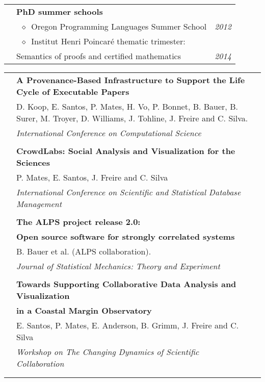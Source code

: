 \documentclass[10pt]{article}
\makeatletter
\newcommand{\category}[2]{
\begin{center}
\vskip 6pt
\begin{tabular*}{\textwidth}{@{}p{0.75in}@{\quad\;\;}p{4in}@{\quad\quad}p{0.7in}}
\vcrush[t]{1in}{\textsc{#1}} &
#2
\end{tabular*}
\end{center}
}
\newcommand{\categoryB}[2]{
\begin{center}
\vskip 6pt
\begin{tabular*}{\textwidth}{@{}p{0.75in}@{\quad\;\;}p{4.4in}@{\quad\quad}p{0.3in}}
\vcrush[t]{1in}{\textsc{#1}} &
#2
\end{tabular*}
\end{center}
}
\newcommand{\n}{\\ & }
\newcommand{\nn}{\\ \n}
\newcommand{\DT}[1]{&\hspace{\stretch 1}\textit{#1}}
\newcommand{\conf}[1]{&\hspace{\stretch 1}\crushr{\textit{#1}}}
\newcommand{\citem}{~$\diamond$~}
\newcommand{\ed}[1]{}
\makeatother
\begin{document}

\category{\mbox{Internships~\textit{\&}} Training}{

{\bf PhD summer schools} \n
\citem Oregon Programming Languages Summer School \DT{\ed{July }2012} \n
\citem Institut Henri Poincar\'e thematic trimester: \n
\quad Semantics of proofs and certified mathematics \DT{\ed{August }2014}%
}


\categoryB{Publications}
{

{\bf A Provenance-Based Infrastructure to Support the Life Cycle of Executable Papers} \conf{\mbox{ICCS 2011}}\n
D. Koop, E. Santos, P. Mates, H. Vo, P. Bonnet, B. Bauer, B. Surer, M. Troyer, D. Williams, J. Tohline, J. Freire and C. Silva.\n
{\em International Conference on Computational Science}\nn

{\bf CrowdLabs: Social Analysis and Visualization for the Sciences} \conf{\mbox{SSDBM 2011}}\n
P. Mates, E. Santos, J. Freire and C. Silva\n
{\em International Conference on Scientific and Statistical Database Management}\nn

{\bf The ALPS project release 2.0:}\n
{\bf Open source software for strongly correlated systems} \conf{\mbox{JSTAT 2011}}\n
B. Bauer et al. (ALPS collaboration).\n
{\em Journal of Statistical Mechanics: Theory and Experiment}\nn

{\bf Towards Supporting Collaborative Data Analysis and Visualization}\n
{\bf in a Coastal Margin Observatory} \conf{\mbox{CSCW 2010}}\n
E. Santos, P. Mates, E. Anderson, B. Grimm, J. Freire and C. Silva\n
{\em Workshop on The Changing Dynamics of Scientific Collaboration}\nn
}

\end{document}

